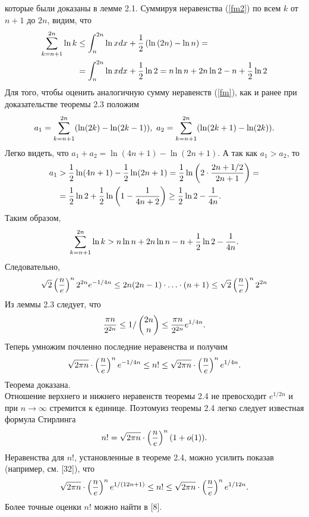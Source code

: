 \documentclass[12pt]{article}
\begin{document}
которые были доказаны в лемме 2.1. Суммируя неравенства (\ref{fm2}) по всем $k$ от $n+1$ до $2n$, видим, что
\begin{align}
      \sum_{k=n+1}^{2n}\ln{k} &\le\int_n^{2n}{\ln{x}d x}+\frac{1}{2} \left(\ln{(2n)}-\ln{n} \right)=\notag \\  &=\int_n^{2n}{\ln{x}d x}+\frac{1}{2}\ln{2}=n\ln{n}+2n\ln{2}-n+\frac{1}{2}\ln{2}  \notag
\end{align}
Для того, чтобы оценить аналогичную сумму неравенств (\ref{fm}), как и ранее при доказательстве теоремы 2.3 положим
\begin{equation}
    a_1=\sum_{k=n+1}^{2n}(\ln(2k)-\ln(2k-1)),\text{ }a_2=\sum_{k=n+1}^{2n}(\ln(2k+1)-\ln(2k)).  \notag
\end{equation}
Легко видеть, что $a_1 + a_2=\ln(4n + 1)-\ln(2n + 1)$. А так как $a_1>a_2$, то
\begin{align}
    a_1 &>\frac{1}{2}\ln(4n+1)-\frac{1}{2}\ln(2n+1)=\frac{1}{2}\ln\left(2\cdot \frac{2n+1/2}{2n+1}\right)=\notag \\
    &= \frac{1}{2}\ln{2}+\frac{1}{2}\ln\left(1-\frac{1}{4n+2}\right)\ge \frac{1}{2}\ln{2}-\frac{1}{4n}.  \notag
\end{align}
Таким образом,
\begin{equation}
    \sum_{k=n+1}^{2n}\ln{k}>n\ln{n}+2n\ln{n}-n+\frac{1}{2}\ln{2}-\frac{1}{4n}.  \notag
\end{equation}
Следовательно,
\begin{equation}
    \sqrt{2}\left(\frac{n}{e}\right)^n2^{2n}e^{-1/4n}\le2n(2n-1)\cdot \ldots \cdot(n+1) \le\sqrt{2} \left(\frac{n}{e}\right)^n2^{2n}  \notag
\end{equation}
Из леммы 2.3 следует, что
\begin{equation}
    \frac{\pi n}{2^{2n}}\le1/\begin{pmatrix} 2n\\n \end{pmatrix}\le \frac{\pi n}{2^{2n}}e^{1/4n}.  \notag
\end{equation}
Теперь умножим почленно последние неравенства и получим
\begin{equation}
    \sqrt{2\pi n}\cdot \left(\frac{n}{e}\right)^n e^{-1/4n}\le n!\le \sqrt{2\pi n}\cdot \left(\frac{n}{e}\right)^n e^{1/4n}.  \notag
\end{equation}
Теорема доказана.\\
Отношение верхнего и нижнего неравенств теоремы 2.4 не превосходит $e^{1/2n}$ и при $n \rightarrow \infty$ стремится к единице. Поэтомуиз теоремы 2.4 легко следует известная формула Стирлинга
\begin{equation}
    n!=\sqrt{2\pi n}\cdot \left(\frac{n}{e}\right)^n(1+o(1)).  \notag
\end{equation}
Неравенства для $n!$, установленные в теореме 2.4, можно усилить показав (например, см. [32]), что
\begin{equation}
     \sqrt{2\pi n}\cdot \left(\frac{n}{e}\right)^n e^{1/(12n+1)}\le n!\le \sqrt{2\pi n}\cdot \left(\frac{n}{e}\right)^n e^{1/12n}.  \notag
\end{equation}
Более точные оценки $n!$ можно найти в [8].
\end{document}

